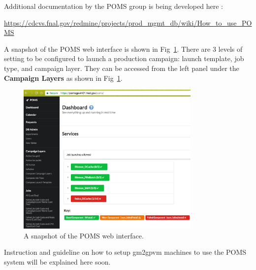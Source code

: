 \noindent Additional documentation by the POMS group is being developed here : 
\begin{center}
{\footnotesize
\url{https://cdcvs.fnal.gov/redmine/projects/prod_mgmt_db/wiki/How_to_use_POMS}}
\end{center}

A snapshot of the POMS web interface is shown in Fig~\ref{fig:POMSSnapshot}. There are 3 levels of setting to be configured to launch a production campaign: launch template, job type, and campaign layer. They can be accessed from the left panel under the \textbf{Campaign Layers} as shown in Fig~\ref{fig:POMSSnapshot}.

\begin{figure}[htbp]
\centering
\includegraphics[width=0.8\textwidth]{pics/POMSSnapshot.pdf} 
\caption{A snapshot of the POMS web interface.}\label{fig:POMSSnapshot}
\end{figure}

Instruction and guideline on how to setup gm2gpvm machines to use the POMS system will be explained here soon.


